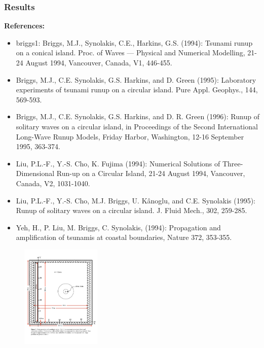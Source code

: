 \subsubsection{Results}


{\bf References:}
\begin {itemize}

\item briggs1:  Briggs, M.J., Synolakis, C.E., Harkins, G.S. (1994):  Tsunami runup on a conical island.  Proc. of Waves — Physical and Numerical Modelling, 21-24 August 1994, Vancouver, Canada, V1, 446-455.
\item Briggs, M.J., C.E. Synolakis, G.S. Harkins, and D. Green (1995): Laboratory experiments of tsunami runup on a circular island. Pure Appl. Geophys., 144, 569-593.
\item Briggs, M.J., C.E. Synolakis, G.S. Harkins, and D. R. Green (1996): Runup of solitary waves on a circular island, in Proceedings of the Second International Long-Wave Runup Models, Friday Harbor, Washington, 12-16 September 1995, 363-374.
\item Liu, P.L.-F., Y.-S. Cho, K. Fujima (1994):  Numerical Solutions of Three-Dimensional Run-up on a Circular Island, 21-24 August 1994, Vancouver, Canada, V2, 1031-1040.
\item Liu, P.L.-F., Y.-S. Cho, M.J. Briggs, U. Kânoglu, and C.E. Synolakis (1995): Runup of solitary waves on a circular island. J. Fluid Mech., 302, 259-285.
\item Yeh, H., P. Liu, M. Briggs, C. Synolakis, (1994): Propagation and amplification of tsunamis at coastal boundaries, Nature 372, 353-355.
\end{itemize}

\begin{figure}[ht]
\hfil\includegraphics[width=1.5in]{bp6/Domain.pdf}\hfil
\end{figure}

